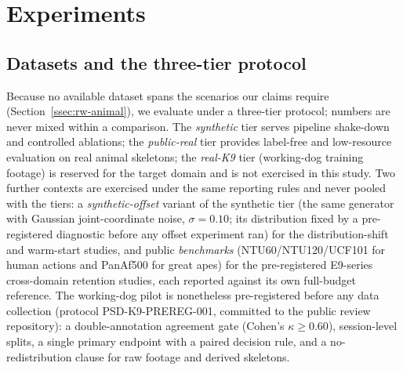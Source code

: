 \section{Experiments}\label{sec:experiments}

\subsection{Datasets and the three-tier protocol}\label{sec:datasets}

Because no available dataset spans the scenarios our claims require (Section~\ref{ssec:rw-animal}), we evaluate under a three-tier protocol; numbers are never mixed within a comparison. The \emph{synthetic} tier serves pipeline shake-down and controlled ablations; the \emph{public-real} tier provides label-free and low-resource evaluation on real animal skeletons; the \emph{real-K9} tier (working-dog training footage) is reserved for the target domain and is not exercised in this study. Two further contexts are exercised under the same reporting rules and never pooled with the tiers: a \emph{synthetic-offset} variant of the synthetic tier (the same generator with Gaussian joint-coordinate noise, $\sigma{=}0.10$; its distribution fixed by a pre-registered diagnostic before any offset experiment ran) for the distribution-shift and warm-start studies, and public \emph{benchmarks} (NTU60/NTU120/UCF101 for human actions and PanAf500 for great apes) for the pre-registered E9-series cross-domain retention studies, each reported against its own full-budget reference. The working-dog pilot is nonetheless pre-registered before any data collection (protocol PSD-K9-PREREG-001, committed to the public review repository): a double-annotation agreement gate (Cohen's $\kappa\geq 0.60$), session-level splits, a single primary endpoint with a paired decision rule, and a no-redistribution clause for raw footage and derived skeletons.

